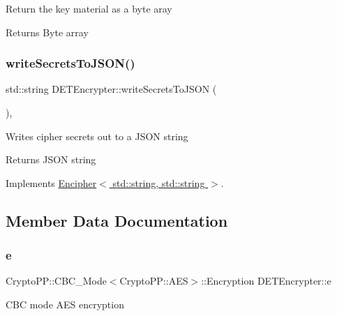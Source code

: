 Return the key material as a byte aray \begin{DoxyReturn}{Returns}
Byte array 
\end{DoxyReturn}
\mbox{\label{classDETEncrypter_a30ffe8f94a95f723e62d0b1a1ed8dc56}} 
\subsubsection{\texorpdfstring{write\+Secrets\+To\+J\+S\+O\+N()}{writeSecretsToJSON()}}
{\footnotesize\ttfamily std\+::string D\+E\+T\+Encrypter\+::write\+Secrets\+To\+J\+S\+ON (\begin{DoxyParamCaption}{ }\end{DoxyParamCaption})\hspace{0.3cm}{\ttfamily [override]}, {\ttfamily [virtual]}}

Writes cipher secrets out to a J\+S\+ON string \begin{DoxyReturn}{Returns}
J\+S\+ON string 
\end{DoxyReturn}


Implements \hyperlink{classEncipher_a27d3efa1e364c1f0d7def65454c61b85}{Encipher$<$ std\+::string, std\+::string $>$}.



\subsection{Member Data Documentation}
\mbox{\label{classDETEncrypter_a29875af9a8c1df01802d11f0a00f5f90}} 
\subsubsection{\texorpdfstring{e}{e}}
{\footnotesize\ttfamily Crypto\+P\+P\+::\+C\+B\+C\+\_\+\+Mode$<$Crypto\+P\+P\+::\+A\+ES$>$\+::Encryption D\+E\+T\+Encrypter\+::e\hspace{0.3cm}{\ttfamily [private]}}

C\+BC mode A\+ES encryption \mbox{\label{classDETEncrypter_a40e99abf751fa9c802b3a4cc9c6796a0}} 
